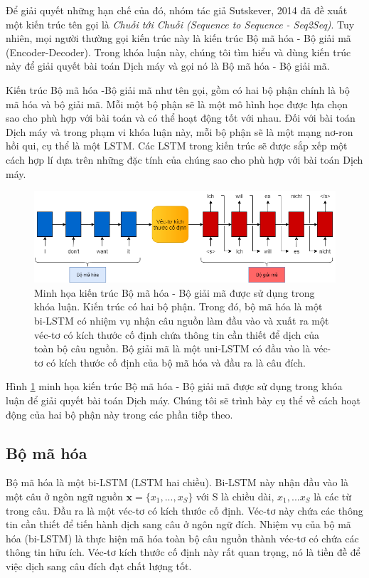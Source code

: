 Để giải quyết những hạn chế của đó, nhóm tác giả Sutskever, 2014 \cite{Seq2Seq2014} đã đề xuất một kiến trúc tên gọi là \textit{Chuỗi tới Chuỗi (Sequence to Sequence - Seq2Seq)}. Tuy nhiên, mọi người thường gọi kiến trúc này là kiến trúc Bộ mã hóa - Bộ giải mã (Encoder-Decoder). Trong khóa luận này, chúng tôi tìm hiểu và dùng kiến trúc này để giải quyết bài toán Dịch máy và gọi nó là Bộ mã hóa - Bộ giải mã.

Kiến trúc Bộ mã hóa  -Bộ giải mã như tên gọi, gồm có hai bộ phận chính là bộ mã hóa và bộ giải mã. Mỗi một bộ phận sẽ là một mô hình học được lựa chọn sao cho phù hợp với bài toán và có thể hoạt động tốt với nhau. Đối với bài toán Dịch máy và trong phạm vi khóa luận này, mỗi bộ phận sẽ là một mạng nơ-ron hồi qui, cụ thể là một LSTM. Các LSTM trong kiến trúc sẽ được sắp xếp một cách hợp lí dựa trên những đặc tính của chúng sao cho phù hợp với bài toán Dịch máy.

\begin{figure}
	\centering
	\includegraphics[width=1.0\textwidth]{Encoder-Decoder_2}
	\caption[Minh họa kiến trúc Bộ mã hóa - Bộ giải mã được sử dụng trong khóa luận.]{Minh họa kiến trúc Bộ mã hóa - Bộ giải mã được sử dụng trong khóa luận. Kiến trúc có hai bộ phận. Trong đó, bộ mã hóa là một bi-LSTM có nhiệm vụ nhận câu nguồn làm đầu vào và xuất ra một véc-tơ có kích thước cố định chứa thông tin cần thiết để dịch của toàn bộ câu nguồn. Bộ giải mã là một uni-LSTM có đầu vào là véc-tơ có kích thước cố định của bộ mã hóa và đầu ra là câu đích.}
	\label{fig_Encoder-Decoder}
\end{figure}

Hình \ref{fig_Encoder-Decoder} minh họa kiến trúc Bộ mã hóa - Bộ giải mã được sử dụng trong khóa luận để giải quyết bài toán Dịch máy. Chúng tôi sẽ trình bày cụ thể về cách hoạt động của hai bộ phận này trong các phần tiếp theo.

\subsection{Bộ mã hóa}
Bộ mã hóa là một bi-LSTM (LSTM hai chiều). Bi-LSTM này nhận đầu vào là một câu ở ngôn ngữ nguồn $\bm{x} = \{x_1, ..., x_S\}$ với S là chiều dài, $x_1,...x_S$ là các từ trong câu. Đầu ra là một véc-tơ có kích thước cố định. Véc-tơ này chứa các thông tin cần thiết để tiến hành dịch sang câu ở ngôn ngữ đích. Nhiệm vụ của bộ mã hóa (bi-LSTM) là thực hiện mã hóa toàn bộ câu nguồn thành véc-tơ có chứa các thông tin hữu ích. Véc-tơ kích thước cố định này rất quan trọng, nó là tiền đề để việc dịch sang câu đích đạt chất lượng tốt.

